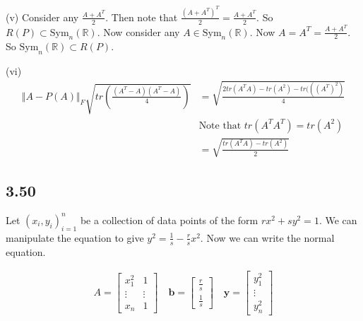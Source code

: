 \documentclass{article}
\begin{document}
	(v) Consider any $\frac{A+ A^T}{2}$. Then note that $\frac{(A + A^T)^T}{2} = \frac{A+ A^T}{2}$. So $R(P) \subset \text{Sym}_n(\mathbb{R})$. Now consider any $A \in \text{Sym}_n(\mathbb{R})$. Now $A = A^T = \frac{A+ A^T}{2}$. So $\text{Sym}_n(\mathbb{R}) \subset R(P)$. 
	
	(vi)
	\begin{align*}
	\Vert A - P(A) \Vert_F \sqrt{tr(\frac{(A^T - A)(A^T - A)}{4})} &= \sqrt{\frac{2tr(A^T A) - tr(A^2) - tr(((A^T)^2)}{4}} \\
	&\text{Note that }tr(A^T A^T) = tr(A^2) \\
	&= \sqrt{\frac{tr(A^T A) - tr(A^2)}{2}}
	\end{align*}
	
	\subsection*{3.50}
	Let $(x_i, y_i)_{i=1}^{n}$ be a collection of data points of the form $rx^2 + sy^2 = 1$. We can manipulate the equation to give $y^2 = \frac{1}{s} - \frac{r}{s} x^2$. Now we can write the normal equation.
	
	\begin{align*}
	A = \begin{bmatrix} x_1^2 & 1 \\ \vdots & \vdots \\ x_n & 1 \end{bmatrix} \quad \mathbf{b} = \begin{bmatrix} \frac{r}{s} \\ \frac{1}{s} \end{bmatrix} \quad \mathbf{y} = \begin{bmatrix} y_1^2 \\ \vdots \\ y_n^2 \end{bmatrix}
	\end{align*}
	
\end{document}
